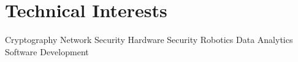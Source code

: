 \section{Technical Interests}
Cryptography \textbullet{} Network Security \textbullet{} Hardware Security \textbullet{} Robotics \textbullet{} Data Analytics \textbullet{} Software Development